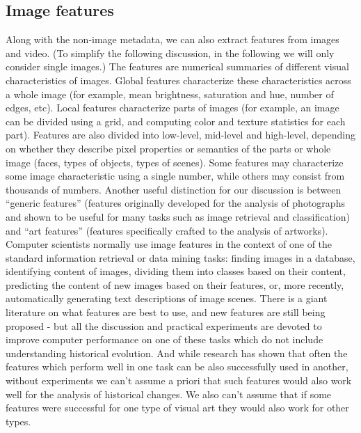 \documentclass[letterpaper]{article}
\begin{document}
\subsection{Image features}
Along with the non-image metadata, we can also extract features from images and video. (To simplify the following discussion, in the following we will only consider single images.) The features are numerical summaries of different visual characteristics of images. Global features characterize these characteristics across a whole image (for example, mean brightness, saturation and hue, number of edges, etc). Local features characterize parts of images (for example, an image can be divided using a grid, and computing color and texture statistics for each part). Features are also divided into low-level, mid-level and high-level, depending on whether they describe pixel properties or semantics of the parts or whole image (faces,  types of objects, types of scenes). Some features may characterize some image characteristic using a single number, while others may consist from thousands of numbers. Another useful distinction for our discussion is between “generic features” (features originally developed for the analysis of photographs and shown to be useful for many tasks such as image retrieval and classification) and “art features” (features specifically crafted to the analysis of artworks). 
	Computer scientists normally use image features in the context of one of the standard information retrieval or data mining tasks: finding images in a database, identifying content of images, dividing them into classes based on their content, predicting the content of new images based on their features, or, more recently, automatically generating text descriptions of image scenes. There is a giant literature on what features are best to use, and new features are still being proposed - but all the discussion and practical experiments are devoted to improve computer performance on one of these tasks which do not include understanding historical evolution. And while research has shown that often the features which perform well in one task can be also successfully used in another, without experiments we can’t assume a priori that such features would also work well for the analysis of historical changes. We also can’t assume that if some features were successful for one type of visual art they would also work for other types.
	
\end{document}
